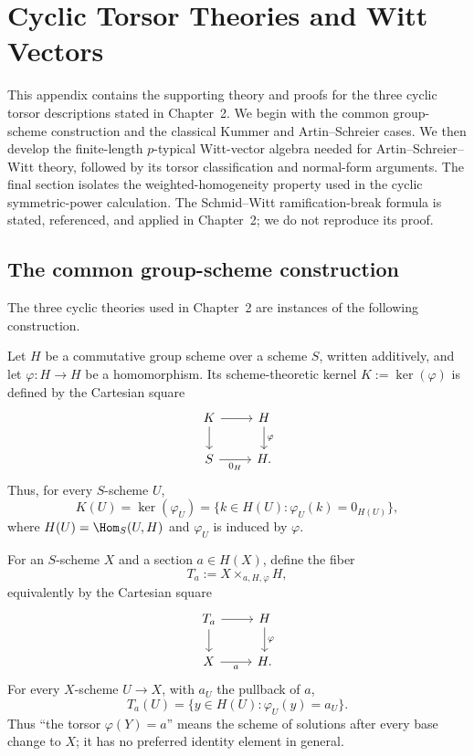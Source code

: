 \chapter{Cyclic Torsor Theories and Witt Vectors}
\label{appendix:witt_vector_algebra}
\label{appendix:cyclic_torsor_theories}

This appendix contains the supporting theory and proofs for the three cyclic
torsor descriptions stated in Chapter~2. We begin with the common
group-scheme construction and the classical Kummer and Artin--Schreier cases.
We then develop the finite-length \(p\)-typical Witt-vector algebra needed for
Artin--Schreier--Witt theory, followed by its torsor classification and
normal-form arguments. The final section isolates the weighted-homogeneity
property used in the cyclic symmetric-power calculation. The Schmid--Witt
ramification-break formula is stated, referenced, and applied in Chapter~2;
we do not reproduce its proof.

\providecommand{\bW}{\mathbb{W}}

\section{The common group-scheme construction}
\label{appendix:common_group_scheme_construction}

The three cyclic theories used in Chapter~2 are instances of the following
construction.

Let $H$ be a commutative group scheme over a scheme $S$, written additively,
and let $\varphi:H\to H$ be a homomorphism. Its scheme-theoretic kernel
$K:=\ker(\varphi)$ is defined by the Cartesian square
\begin{equation}\label{eq:kernel_square}
\begin{tikzcd}
K \arrow[r] \arrow[d] & H \arrow[d,"\varphi"] \\
S \arrow[r,"0_H"'] & H.
\end{tikzcd}
\end{equation}
Thus, for every $S$-scheme $U$,
\begin{equation}\label{eq:kernel_on_U_valued_points}
K(U)=\ker(\varphi_U)
    =\{k\in H(U):\varphi_U(k)=0_{H(U)}\},
\end{equation}
where $H(U)=\Hom_S(U,H)$ and $\varphi_U$ is induced by $\varphi$.

For an $S$-scheme $X$ and a section $a\in H(X)$, define the fiber
\begin{equation}\label{eq:fiber_torsor_definition}
T_a:=X\times_{a,H,\varphi}H,
\end{equation}
equivalently by the Cartesian square
\[
\begin{tikzcd}
T_a \arrow[r] \arrow[d] & H \arrow[d,"\varphi"] \\
X \arrow[r,"a"'] & H.
\end{tikzcd}
\]
For every $X$-scheme $U\to X$, with $a_U$ the pullback of $a$,
\[
T_a(U)=\{y\in H(U):\varphi_U(y)=a_U\}.
\]
Thus ``the torsor $\varphi(Y)=a$'' means the scheme of solutions after every
base change to $X$; it has no preferred identity element in general.

